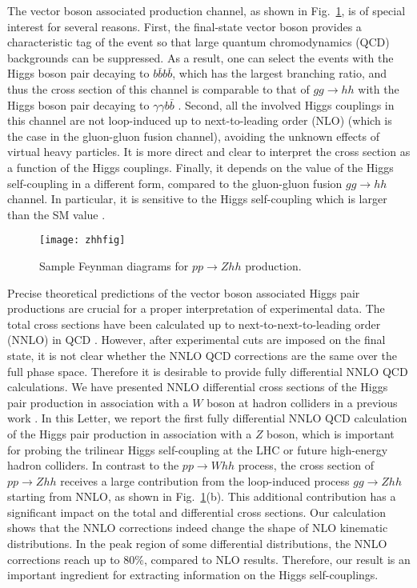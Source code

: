 \documentclass[a4paper,amsmath,preprintnumbers,showpacs,twocolumn,prl,superscriptaddress, nofootinbib]{revtex4}
\begin{document}
The vector boson associated production channel, as shown in Fig.~\ref{fig:top_loop},
is of special interest for several reasons.
First, the final-state vector boson provides a characteristic tag of the event 
so that large quantum chromodynamics (QCD) backgrounds can be suppressed.
As a result, one can select the events with  the Higgs boson pair decaying to $b\bar{b}b\bar{b}$, 
which has the largest branching ratio,
and thus the cross section of this channel is comparable to that of $gg\to hh$
with  the Higgs boson pair decaying to $\gamma\gamma b\bar{b} $ \cite{Cao:2015oxx}.
Second, all the involved  Higgs couplings in this channel are not loop-induced up to next-to-leading order (NLO)
(which is the case in the gluon-gluon fusion channel),
avoiding the unknown  effects of virtual heavy particles.
It is more direct and clear to interpret the cross section as a function of the Higgs couplings.
Finally, it depends on the value of the Higgs self-coupling in a different form, compared to
the gluon-gluon fusion $gg\to hh$ channel.
In particular, it is  sensitive to the Higgs self-coupling which is larger than the SM value \cite{Frederix:2014hta,Cao:2015oxx}.

\begin{figure}
  \texttt{[image: zhhfig]}\\
  \caption{Sample Feynman diagrams for  $pp\to Zhh$ production. }
  \label{fig:top_loop}
\end{figure}

Precise theoretical predictions  of the vector boson associated Higgs pair productions are crucial for a proper interpretation of experimental data.
The total cross sections  have been calculated up to next-to-next-to-leading order (NNLO) in QCD  \cite{Baglio:2012np}.
However, after experimental cuts are imposed on the final state,
it is not clear whether the NNLO QCD corrections are the same over the full phase space.
Therefore it is desirable to provide fully differential NNLO QCD calculations.
We have presented NNLO differential cross sections of the
Higgs pair production in association with a $W$ boson at hadron colliders
in a previous work \cite{Li:2016nrr}.
In this Letter, we report the first fully differential NNLO QCD calculation  of the Higgs pair production in association with
 a $Z$ boson,
which is important for probing the trilinear Higgs self-coupling at the LHC or future high-energy hadron colliders.
In contrast to the $pp\to Whh$ process, the cross section of $pp\to Zhh$ receives a large contribution from the 
loop-induced process $gg\to Zhh$ starting from NNLO, as shown in Fig.~\ref{fig:top_loop}(b).
This additional contribution has a significant impact  on the total and differential cross sections.
Our  calculation  shows that the NNLO corrections indeed change the shape of NLO kinematic distributions.
In the peak region of some differential distributions, the NNLO corrections reach up to $80\%$, compared to NLO results.
Therefore, our result is an important ingredient for extracting information on the Higgs self-couplings.
\end{document}
